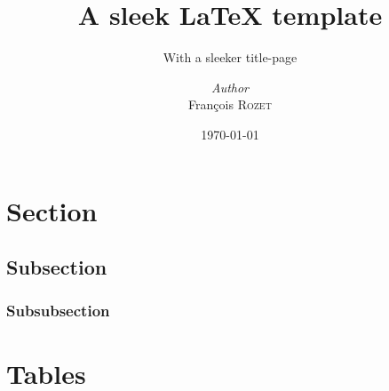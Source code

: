 \documentclass[a4paper, 12pt]{article}
\institute{Random University}
\title{A sleek \LaTeX{} template}
\subtitle{With a sleeker title-page}
\author{\textit{Author}\\François \textsc{Rozet}}
\date{\today}
\begin{document}
    \maketitle
    \romantableofcontents

    \section{Section}
    \subsection{Subsection}
    \subsubsection{Subsubsection}

    \newpage

    \nocite{*}
    \printbibliography

    \newpage

    \appendix

    \section{Tables}
\end{document}
